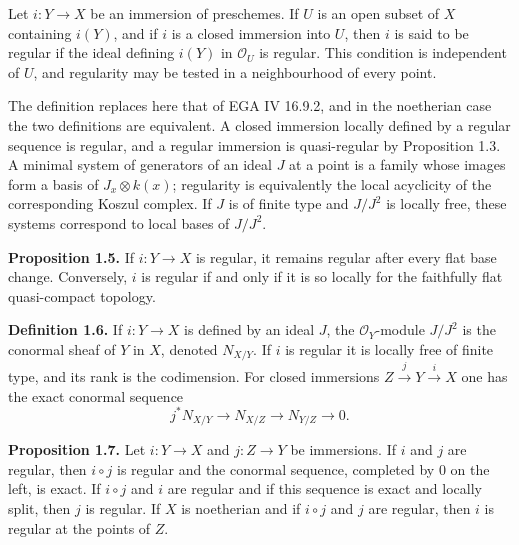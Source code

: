 \documentclass[11pt]{article}
\providecommand{\cO}{\mathcal O}
\begin{document}
Let \(i:Y\to X\) be an immersion of preschemes. If \(U\) is an open subset of \(X\) containing \(i(Y)\), and if \(i\) is a closed immersion into \(U\), then \(i\) is said to be regular if the ideal defining \(i(Y)\) in \(\cO_U\) is regular. This condition is independent of \(U\), and regularity may be tested in a neighbourhood of every point.

The definition replaces here that of EGA IV 16.9.2, and in the noetherian case the two definitions are equivalent. A closed immersion locally defined by a regular sequence is regular, and a regular immersion is quasi-regular by Proposition 1.3. A minimal system of generators of an ideal \(J\) at a point is a family whose images form a basis of \(J_x\otimes k(x)\); regularity is equivalently the local acyclicity of the corresponding Koszul complex. If \(J\) is of finite type and \(J/J^2\) is locally free, these systems correspond to local bases of \(J/J^2\).

\textbf{Proposition 1.5.} If \(i:Y\to X\) is regular, it remains regular after every flat base change. Conversely, \(i\) is regular if and only if it is so locally for the faithfully flat quasi-compact topology.

\textbf{Definition 1.6.} If \(i:Y\to X\) is defined by an ideal \(J\), the \(\cO_Y\)-module \(J/J^2\) is the conormal sheaf of \(Y\) in \(X\), denoted \(N_{X/Y}\). If \(i\) is regular it is locally free of finite type, and its rank is the codimension. For closed immersions \(Z\xrightarrow{j}Y\xrightarrow{i}X\) one has the exact conormal sequence
\begin{equation}\tag{1.6.1}
 j^*N_{X/Y}\longrightarrow N_{X/Z}\longrightarrow N_{Y/Z}\longrightarrow0.
\end{equation}

\textbf{Proposition 1.7.} Let \(i:Y\to X\) and \(j:Z\to Y\) be immersions. If \(i\) and \(j\) are regular, then \(i\circ j\) is regular and the conormal sequence, completed by \(0\) on the left, is exact. If \(i\circ j\) and \(i\) are regular and if this sequence is exact and locally split, then \(j\) is regular. If \(X\) is noetherian and if \(i\circ j\) and \(j\) are regular, then \(i\) is regular at the points of \(Z\).
\end{document}
